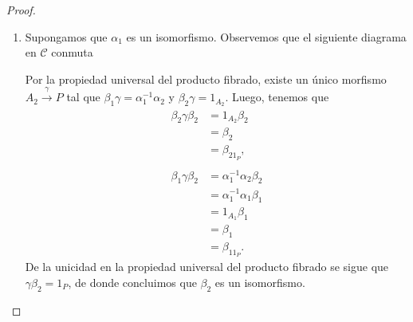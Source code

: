 \documentclass[tesis]{subfiles}
\begin{document}
\begin{proof}
\begin{enumerate}[label=(\alph*)]
        \item Supongamos que $\alpha_1$ es un isomorfismo. Observemos que el siguiente diagrama en $\mathscr{C}$ conmuta
    \begin{center}
    \end{center}
    Por la propiedad universal del producto fibrado, existe un único morfismo $A_2\xrightarrow[]{\gamma} P$ tal que $\beta_1\gamma=\alpha_1^{-1}\alpha_2$ y $\beta_2\gamma=1_{A_2}$. Luego, tenemos que
    \begin{align*}
        \beta_2\gamma\beta_2 &= 1_{A_2}\beta_2 \\
                             &= \beta_2 \\
                             &= \beta_21_P, \\ \\
        \beta_1\gamma\beta_2 &= \alpha_1^{-1}\alpha_2\beta_2 \\
                             &= \alpha_1^{-1}\alpha_1\beta_1 \\
                             &= 1_{A_1}\beta_1 \\
                             &= \beta_1 \\
                             &= \beta_11_P.
    \end{align*}
    De la unicidad en la propiedad universal del producto fibrado se sigue que $\gamma\beta_2=1_P$, de donde concluimos que $\beta_2$ es un isomorfismo.
    \end{enumerate}
\end{proof}
\end{document}
